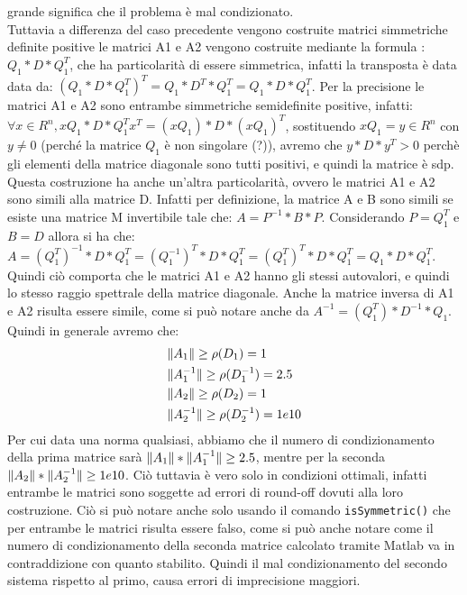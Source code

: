 \documentclass[12pt]{article}
\begin{document}
\begin{enumerate}
    grande significa che il problema è mal condizionato. \\
    Tuttavia a differenza del caso precedente vengono costruite matrici simmetriche definite positive le matrici A1 e A2 vengono costruite mediante la formula : \(Q_1 * D * Q_1^{T}\), che ha particolarità di essere simmetrica,
    infatti la transposta è data data da: \((Q_1 * D * Q_1^{T})^{T}=Q_1*D^{T}*Q_1^{T}=Q_1 * D * Q_1^{T}\). 
    Per la precisione le matrici A1 e A2 sono entrambe simmetriche semidefinite positive, infatti:
    \(\forall x \in R^{n}, xQ_1 * D * Q_1^{T}x^{T} = (xQ_1) * D * (xQ_1)^{T}\), sostituendo \(xQ_1=y \in R^{n}\) con \(y \ne 0\) 
    (perché la matrice \(Q_1\) è non singolare (?)), avremo che \(y*D*y^{T}>0\) perchè gli elementi della matrice diagonale sono tutti positivi, e quindi la matrice è sdp.
    Questa costruzione ha anche un'altra particolarità, ovvero le matrici A1 e A2 sono simili alla matrice D. Infatti per definizione,
    la matrice A e B sono simili se esiste una matrice M invertibile tale che: \(A=P^{-1}*B*P\). Considerando \(P=Q_1^{T}\) e \(B=D\) 
    allora si ha che: \(A=(Q_1^{T})^{-1}*D*Q_1^{T} = (Q_1^{-1})^{T}*D*Q_1^{T} = (Q_1^{T})^{T}*D*Q_1^{T} = Q_1*D*Q_1^{T}\). 
    Quindi ciò comporta che le matrici A1 e A2 hanno gli stessi autovalori, e quindi lo stesso raggio spettrale della matrice diagonale.
    Anche la matrice inversa di A1 e A2 risulta essere simile, come si può notare anche da \(A^{-1}=(Q_1^{T})*D^{-1}*Q_1\).
    Quindi in generale avremo che: 
    \begin{equation*}
        \begin{aligned}
            & \Arrowvert A_1 \Arrowvert \ge \rho(D_1) = 1  \\
            & \Arrowvert A_1^{-1} \Arrowvert \ge \rho(D_1^{-1}) = 2.5 \\
            & \Arrowvert A_2 \Arrowvert \ge \rho(D_2) = 1  \\
            & \Arrowvert A_2^{-1} \Arrowvert \ge \rho(D_2^{-1}) = 1e10  \\
        \end{aligned}
    \end{equation*}
    Per cui data una norma qualsiasi, abbiamo che il numero di condizionamento della prima matrice sarà 
    \(\Arrowvert A_1 \Arrowvert * \Arrowvert A_1^{-1} \Arrowvert \ge 2.5\), mentre per la seconda 
    \(\Arrowvert A_2 \Arrowvert * \Arrowvert A_2^{-1} \Arrowvert \ge 1e10\). 
    Ciò tuttavia è vero solo in condizioni ottimali, infatti entrambe le matrici 
    sono soggette ad errori di round-off dovuti alla loro costruzione.
    Ciò si può notare anche solo usando il comando \texttt{isSymmetric()}
    che per entrambe le matrici risulta essere falso, come si può anche notare come il 
    numero di condizionamento della seconda matrice calcolato 
    tramite Matlab va in contraddizione con quanto stabilito.
    Quindi il mal condizionamento del secondo sistema rispetto al primo, causa errori di imprecisione maggiori.

\end{enumerate}
\end{document}

